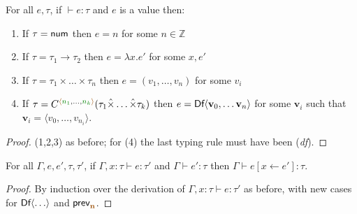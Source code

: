 \begin{lemma}
\label{thm:structural-df-canon}
For all $e, \tau$, if $\vdash e : \tau$ and $e$ is a value then:
\begin{enumerate}
  \item If $\tau=\ident{num}$ then $e = n$ for some $n \in \mathbb{Z}$
  \item If $\tau=\tau_1 \rightarrow \tau_2$ then $e = \lambda x.e'$ for some $x, e'$
  \item If $\tau=\tau_1\times\ldots\times\tau_n$ then $e = (v_1, \ldots, v_n)$ for some $v_i$
  \item If $\tau=\ctyp{\alift{\cclrd{n_1}, \ldots, \cclrd{n_k}}}{(\tau_1\xtimes\ldots\xtimes\tau_k)}$
    then $e = \ident{Df}\langle \textbf{v}_0, \ldots \textbf{v}_n\rangle$ for some $\textbf{v}_i$
    such that $\textbf{v}_i = \langle v_0, \ldots, v_{n_i}\rangle$.
\end{enumerate}
\end{lemma}
\begin{proof}
  (1,2,3) as before; for (4) the last typing rule must have been (\emph{df}).
\end{proof}

\begin{lemma}
\label{thm:structural-df-pres-subst}
For all $\Gamma, e, e', \tau, \tau'$, if $\Gamma, x:\tau \vdash e : \tau'$ and $\Gamma \vdash e' : \tau$
then $\Gamma \vdash e[x \leftarrow e'] : \tau$.
\end{lemma}
\begin{proof}
  By induction over the derivation of $\Gamma, x:\tau \vdash e : \tau'$ as before, with new
  cases for $\textnormal{\sffamily Df}\langle\ldots\rangle$ and $\ident{prev}_{\aclrd{\textbf{n}}}$.
\end{proof}

